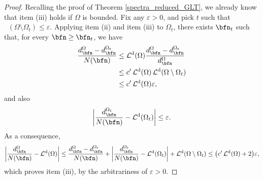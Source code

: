 \documentclass{amsart}
\DeclareMathOperator{\Ld}{\mathcal{L}^d}
\begin{document}
\begin{proof}
    Recalling the proof of Theorem \ref{spectra_reduced_GLT}, we already know that item (iii) holds if $\Omega$ is bounded. Fix any $\varepsilon>0$, and pick $t$ such that $\Ld(\Omega\setminus\Omega_t)\leq\varepsilon.$
    Applying item (ii) and item (iii) to $\Omega_t$, there exists $\bfn_t$ such that, for every $\bfn\geq\bfn_t$, we have
    \begin{align*}
          \frac{d_\bfn^{\Omega}-d_\bfn^{\Omega_t}}{N(\bfn)}&\leq\Ld(\Omega)\frac{d_\bfn^{\Omega}-d_\bfn^{\Omega_t}}{d_\bfn^{\Omega}}\\
          &\leq c'\Ld(\Omega)\Ld(\Omega\setminus\Omega_t)\\
          &\leq c'\Ld(\Omega)\varepsilon,
    \end{align*}
    and also
    \begin{equation*}
        \bigg\vert\frac{d_\bfn^{\Omega_t}}{N(\bfn)}-\Ld(\Omega_t)\bigg\vert\leq\varepsilon.
    \end{equation*}
    As a consequence,
    \begin{equation*}
        \bigg\vert\frac{d_\bfn^{\Omega}}{N(\bfn)}-\Ld(\Omega)\bigg\vert\leq\frac{d_\bfn^{\Omega}-d_\bfn^{\Omega_t}}{N(\bfn)}+\bigg\vert\frac{d_\bfn^{\Omega_t}}{N(\bfn)}-\Ld(\Omega_t)\bigg\vert+\Ld(\Omega\setminus\Omega_t)\leq \big(c'\Ld(\Omega)+2\big)\varepsilon,
    \end{equation*}
    which proves item (iii), by the arbitrariness of $\varepsilon>0$.
\end{proof}
\end{document}
